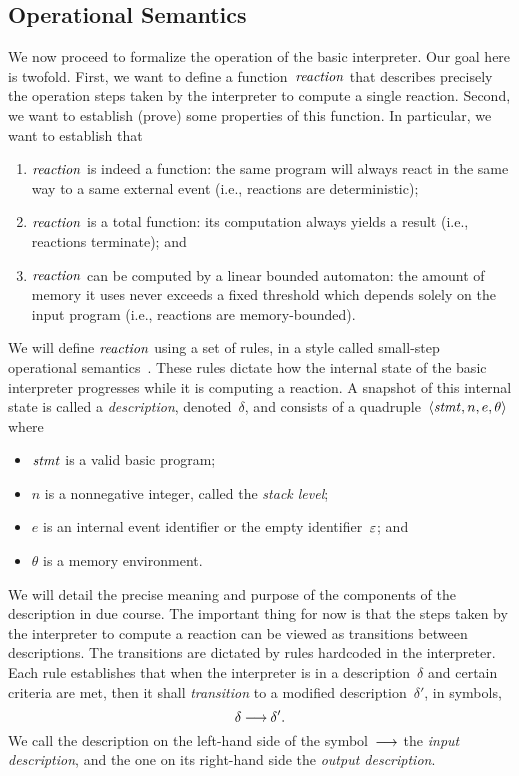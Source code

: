 \subsection{Operational Semantics}
\label{sec.sem.opsem}

We now proceed to formalize the operation of the basic \CEU interpreter.
Our goal here is twofold.  First, we want to define a function~$\mathop{\mathit{reaction}}$
that describes precisely the operation steps taken by the interpreter to
compute a single reaction.  Second, we want to establish (prove) some
properties of this function.  In particular, we want to establish that
\begin{enumerate}
\item $\mathop{\mathit{reaction}}$ is indeed a function: the same program will always react
  in the same way to a same external event (i.e., reactions are
  deterministic);
\item $\mathop{\mathit{reaction}}$ is a total function: its computation always yields a
  result (i.e., reactions terminate); and
\item $\mathop{\mathit{reaction}}$ can be computed by a linear bounded automaton: the amount
  of memory it uses never exceeds a fixed threshold which depends solely on
  the input program (i.e., reactions are memory-bounded).
\end{enumerate}

We will define $\mathop{\mathit{reaction}}$ using a set of rules, in a style called
small-step operational semantics~\cite{Plotkin-G-D-1981}.  These rules
dictate how the internal state of the basic \CEU interpreter progresses
while it is computing a reaction.  A snapshot of this internal state is
called a \emph{description}, denoted~$\delta$, and consists of a
quadruple~$\<\stmt,n,e,\theta>$ where
\begin{itemize}
\item $\mathit{stmt}$ is a valid basic \CEU program;
\item $n$ is a nonnegative integer, called the \emph{stack level};
\item $e$ is an internal event identifier or the empty identifier~$\varepsilon$;
  and
\item $\theta$ is a memory environment.
\end{itemize}

We will detail the precise meaning and purpose of the components of the
description in due course.  The important thing for now is that the steps
taken by the interpreter to compute a reaction can be viewed as transitions
between descriptions.  The transitions are dictated by rules hardcoded in
the interpreter.  Each rule establishes that when the interpreter is in a
description~$\delta$ and certain criteria are met, then it shall
\emph{transition} to a modified description~$\delta'$, in symbols,
\[
  \delta\trans\delta'.
\]
We call the description on the left-hand side of the symbol~$\trans$ the
\emph{input description}, and the one on its right-hand side the
\emph{output description}.

